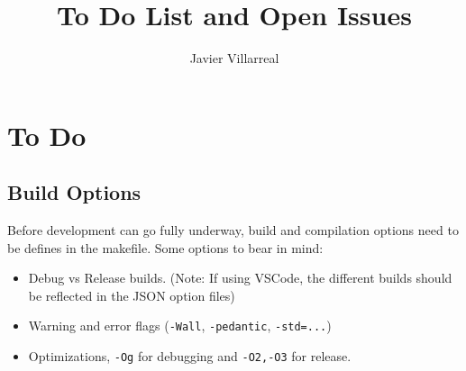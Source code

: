 \documentclass[12pt]{article}
\begin{document}
    \title{To Do List and Open Issues}
    \author{Javier Villarreal}
    \date{}
    \maketitle

    \section*{To Do}

    \subsection*{Build Options}
    Before development can go fully underway, build and compilation options need to be defines in the makefile. Some options to bear in mind:
    \begin{itemize}
        \item Debug vs Release builds. (Note: If using VSCode, the different builds should be reflected in the JSON option files)
        \item Warning and error flags (\texttt{-Wall}, \texttt{-pedantic}, \texttt{-std=...})
        \item Optimizations, \texttt{-Og} for debugging and \texttt{-O2,-O3} for release.
    \end{itemize}
\end{document}
